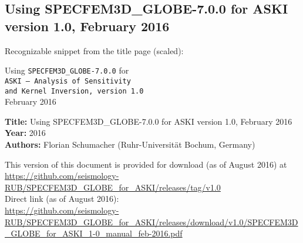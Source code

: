 \subsection*{Using SPECFEM3D\_GLOBE-7.0.0 for ASKI version 1.0, February 2016}

Recognizable snippet from the title page (scaled):

\begin{center}
  {\large Using} {\tt \LARGE SPECFEM3D\_GLOBE-7.0.0} {\large for} \\ {\tt {\LARGE ASKI} {\rm--} {\LARGE A}{\small nalysis of} {\LARGE S}{\small ensitivity \\ and} {\LARGE\tt K}{\small ernel} {\LARGE\tt I}{\small nversion, version 1.0}}\\February 2016
\end{center}

{\bf Title: } Using SPECFEM3D\_GLOBE-7.0.0 for ASKI version 1.0, February 2016\\
{\bf Year: } 2016\\
{\bf Authors: } Florian Schumacher (Ruhr-Universit\"at Bochum, Germany)

This version of this document is provided for download (as of August 2016) at\\
\url{https://github.com/seismology-RUB/SPECFEM3D_GLOBE_for_ASKI/releases/tag/v1.0}\\
Direct link (as of August 2016):\\
\url{https://github.com/seismology-RUB/SPECFEM3D_GLOBE_for_ASKI/releases/download/v1.0/SPECFEM3D_GLOBE_for_ASKI_1-0_manual_feb-2016.pdf}
